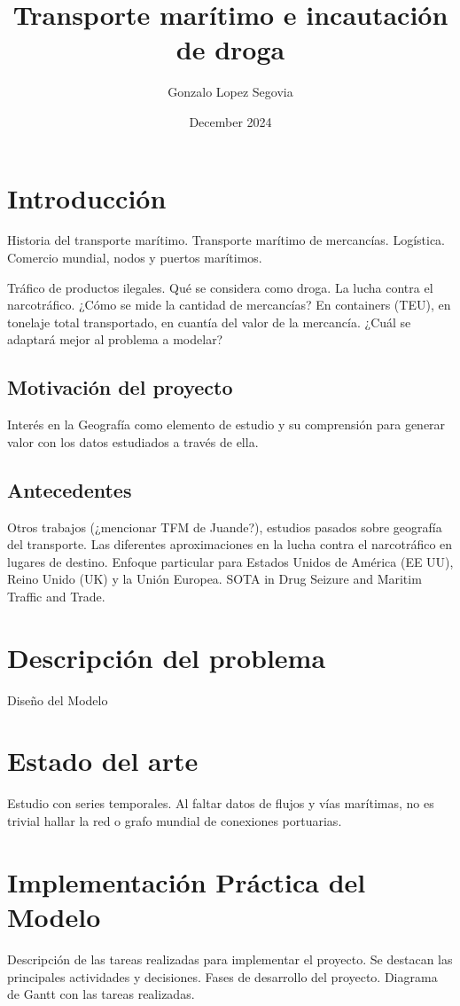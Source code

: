\documentclass{article}
\title{Transporte marítimo e incautación de droga}
\author{Gonzalo Lopez Segovia}
\date{December 2024}
\begin{document}
\maketitle

\section{Introducción}
Historia del transporte marítimo. Transporte marítimo de mercancías. Logística.
Comercio mundial, nodos y puertos marítimos.

Tráfico de productos ilegales. Qué se considera como droga. La lucha contra el narcotráfico.
¿Cómo se mide la cantidad de mercancías? En containers (TEU), en tonelaje total transportado, en
cuantía del valor de la mercancía. ¿Cuál se adaptará mejor al problema a modelar?

\subsection{Motivación del proyecto}
Interés en la Geografía como elemento de estudio y su comprensión para generar valor con los datos estudiados a través de ella.


\subsection{Antecedentes}
Otros trabajos (¿mencionar TFM de Juande?), estudios pasados sobre geografía del transporte.
Las diferentes aproximaciones en la lucha contra el narcotráfico en lugares de destino. Enfoque particular para Estados Unidos de América (EE UU), Reino Unido (UK) y la Unión Europea.
SOTA in Drug Seizure and Maritim Traffic and Trade.

\section{Descripción del problema}
Diseño del Modelo

\section{Estado del arte}
Estudio con series temporales.
Al faltar datos de flujos y vías marítimas, no es trivial hallar la red o grafo mundial de conexiones portuarias.


\section{Implementación Práctica del Modelo}
Descripción de las tareas realizadas para implementar el proyecto.
Se destacan las principales actividades y decisiones.
Fases de desarrollo del proyecto.
Diagrama de Gantt con las tareas realizadas.
\end{document}
